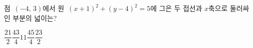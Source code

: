 점~$(-4,\,3)$에서 원~$(x+1)^2+(y-4)^2=5$에 그은 두 접선과 $x$축으로 둘러싸인 부분의 넓이는?
\begin{choices32}{$\dfrac{21}{2}$}{$\dfrac{43}{4}$}{$11$}{$\dfrac{45}{4}$}{$\dfrac{23}{2}$}\end{choices32}

